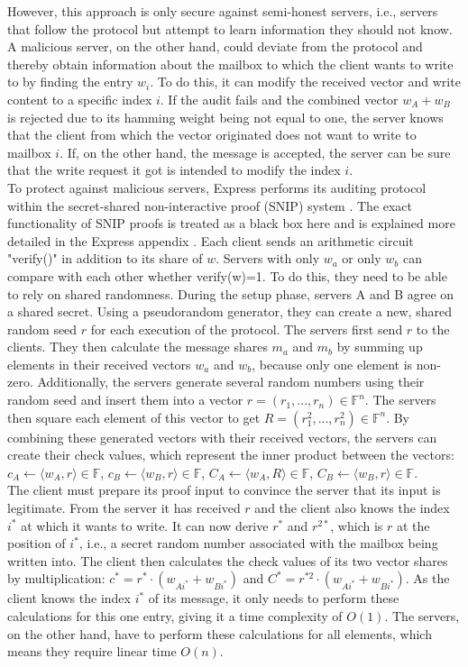 \documentclass[a4paper]{article}
\begin{document}
However, this approach is only secure against semi-honest servers, i.e., servers that follow the protocol but attempt to learn information they should not know. A malicious server, on the other hand, could deviate from the protocol and thereby obtain information about the mailbox to which the client wants to write to by finding the entry $w_i$. To do this, it can modify the received vector and write content to a specific index $i$. If the audit fails and the combined vector $w_A + w_B$ is rejected due to its hamming weight being not equal to one, the server knows that the client from which the vector originated does not want to write to mailbox $i$. If, on the other hand, the message is accepted, the server can be sure that the write request it got is intended to modify the index $i$. \\
To protect against malicious servers, Express performs its auditing protocol within the secret-shared non-interactive proof (SNIP) system \citep{Prio2017}. The exact functionality of SNIP proofs is treated as a black box here and is explained more detailed in the Express appendix \citep{Eskandarian2021}. Each client sends an arithmetic circuit "verify()" in addition to its share of $w$. Servers with only $w_a$ or only $w_b$ can compare with each other whether verify(w)=1. To do this, they need to be able to rely on shared randomness. During the setup phase, servers A and B agree on a shared secret. Using a pseudorandom generator, they can create a new, shared random seed $r$ for each execution of the protocol. The servers first send $r$ to the clients. They then calculate the message shares $m_a$ and $m_b$ by summing up elements in their received vectors $w_a$ and $w_b$, because only one element is non-zero. Additionally, the servers generate several random numbers using their random seed and insert them into a vector $r = (r_1,...,r_n) \in \mathbb{F}^n$. The servers then square each element of this vector to get $R=(r_1^2,...,r_n^2) \in \mathbb{F}^n$. By combining these generated vectors with their received vectors, the servers can create their check values, which represent the inner product between the vectors: $c_A \leftarrow \langle w_A, r \rangle \in \mathbb{F}$, $c_B \leftarrow \langle w_B, r \rangle \in \mathbb{F}$, $C_A \leftarrow \langle w_A, R \rangle \in \mathbb{F}$, $C_B \leftarrow \langle w_B, r \rangle \in \mathbb{F}$. \\
The client must prepare its proof input to convince the server that its input is legitimate. From the server it has received $r$ and the client also knows the index $i^*$ at which it wants to write. It can now derive $r^*$ and $r^{2*}$, which is $r$ at the position of $i^*$, i.e., a secret random number associated with the mailbox being written into. The client then calculates the check values of its two vector shares by multiplication: $c^* = r^* \cdot (w_{Ai^*}+w_{Bi^*})$ and $C^* = r^{*2} \cdot (w_{Ai^*}+w_{Bi^*})$. As the client knows the index $i^*$ of its message, it only needs to perform these calculations for this one entry, giving it a  time complexity of $O(1)$. The servers, on the other hand, have to perform these calculations for all elements, which means they require linear time $O(n)$. \\
\end{document}
